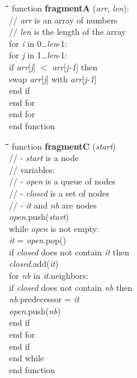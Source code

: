 \documentclass[a4paper]{article}
\begin{document}
\small
\noindent
\begin{minipage}[t]{0.44\columnwidth}
  
  \begin{tabbing}
    \quad\=\quad\=\quad\=\quad\=\quad\=\kill
    function \textbf{fragmentA} (\emph{arr}, \emph{len}):\\
    \>// \emph{arr} is an array of numbers\\
    \>// \emph{len} is the length of the array\\
    \>for \emph{i} in 0\ldots\emph{len}-1:\\
    \>\>for \emph{j} in 1\ldots\emph{len}-1:\\
    \>\>\>if \emph{arr}[\emph{j}] $<$ \emph{arr}[\emph{j-1}] then\\
    \>\>\>\>swap \emph{arr}[\emph{j}] with \emph{arr}[\emph{j-1}]\\
    \>\>\>end if\\
    \>\>end for\\
    \>end for\\
    end function
  \end{tabbing}
  
  \begin{tabbing}
    \quad\=\quad\=\quad\=\quad\=\quad\=\kill
    function \textbf{fragmentC} (\emph{start})\\
    \>// - \emph{start} is a node\\
    \>// variables:\\
    \>// - \emph{open} is a queue of nodes\\
    \>// - \emph{closed} is a set of nodes\\
    \>// - \emph{it} and \emph{nb} are nodes\\
    \>\emph{open}.push(\emph{start})\\
    \>while \emph{open} is not empty:\\
    \>\>\emph{it} = \emph{open}.pop()\\
    \>\>if \emph{closed} does not contain \emph{it} then\\
    \>\>\>\emph{closed}.add(\emph{it})\\
    \>\>\>for \emph{nb} in \emph{it}.neighbors:\\
    \>\>\>\>if \emph{closed} does not contain \emph{nb} then\\
    \>\>\>\>\>\emph{nb}.predecessor = \emph{it}\\
    \>\>\>\>\>\emph{open}.push(\emph{nb})\\
    \>\>\>\>end if\\
    \>\>\>end for\\
    \>\>end if\\
    \>end while\\
    end function
  \end{tabbing}
  
\end{minipage}%
\end{document}
